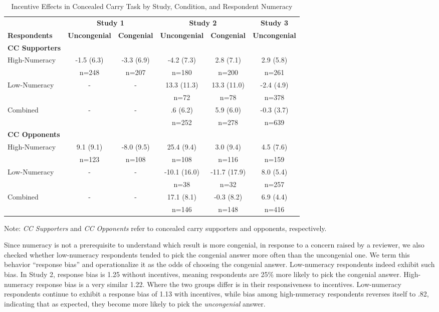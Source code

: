 \documentclass[12pt, letterpaper]{article}
\begin{document}
\singlespacing
\begin{table}[h]
\centering
\caption{Incentive Effects in Concealed Carry Task by Study, Condition, and Respondent Numeracy} \label{tab:accnum}
\begin{tabular}{| l | c c | c c | c |}
\hline 
& \multicolumn{2}{c}{\bf Study 1}	& \multicolumn{2}{|c|}{\bf Study 2} & {\bf Study 3}	\\
{\bf Respondents} & {\bf Uncongenial} & {\bf Congenial} & {\bf Uncongenial} & {\bf Congenial} & {\bf Uncongenial}	\\ 
\hline
{\bf CC Supporters} & & & & & \\
High-Numeracy	& -1.5 (6.3)& -3.3 (6.9)	& -4.2 (7.3)	& 2.8 (7.1)		& 2.9 (5.8)	\\ 
			& n=248	& n=207		& n=180		& n=200		& n=261	\\ 
Low-Numeracy	& -		& -			& 13.3 (11.3)	& 13.3 (11.0)	& -2.4 (4.9)\\ 
			& 		& 			& n=72		& n=78		& n=378	\\ 
Combined		& -		& -			& .6 (6.2)		& 5.9 (6.0)		& -0.3 (3.7)\\ 
			& 		&			& n=252		& n=278		& n=639	\\ 
\hline
{\bf CC Opponents} & & & & & \\
High-Numeracy	& 9.1 (9.1)	& -8.0 (9.5)	& 25.4 (9.4) 	& 3.0 (9.4)		& 4.5 (7.6)	\\ 
			& n=123	& n=108		& n=108		& n=116		& n=159	\\ 
Low-Numeracy	& - 		& -			& -10.1 (16.0)	& -11.7 (17.9)	& 8.0 (5.4)	\\ 
			& 		& 			& n=38		& n=32		& n=257	\\ 
Combined		& -		& -			& 17.1 (8.1)	& -0.3 (8.2)	& 6.9 (4.4)	\\ 
			& 		& 			& n=146		& n=148		& n=416	\\ 
\hline
\end{tabular}
\footnotesize{Note: {\it CC Supporters} and {\it CC Opponents} refer to concealed carry supporters and opponents, respectively.}
\end{table}
\doublespacing

Since numeracy is not a prerequisite to understand which result is more congenial, in response to a concern raised by a reviewer, we also checked whether low-numeracy respondents tended to pick the congenial answer more often than the uncongenial one. We term this behavior ``response bias'' and operationalize it as the odds of choosing the congenial answer. Low-numeracy respondents indeed exhibit such bias. In Study 2, response bias is 1.25 without incentives, meaning respondents are 25\% more likely to pick the congenial answer. High-numeracy response bias is a very similar 1.22. Where the two groups differ is in their responsiveness to incentives. Low-numeracy respondents continue to exhibit a response bias of 1.13 with incentives, while bias among high-numeracy respondents reverses itself to .82, indicating that as expected, they become more likely to pick the {\it uncongenial} answer.
\end{document}

